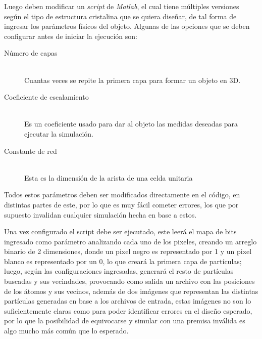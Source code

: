 Luego deben modificar un \emph{script} de \emph{Matlab}, el cual tiene múltiples versiones según el tipo de estructura cristalina que se quiera diseñar, de tal forma de ingresar los parámetros físicos del objeto. Algunas de las opciones que se deben configurar antes de iniciar la ejecución son:

\begin{description}
	\item [Número de capas] \hfill \\
		Cuantas veces se repite la primera capa para formar un objeto en 3D.
	\item [Coeficiente de escalamiento] \hfill \\
		Es un coeficiente usado para dar al objeto las medidas deseadas para ejecutar la simulación.
	\item [Constante de red] \hfill \\
		Esta es la dimensión de la arista de una celda unitaria
\end{description}

Todos estos parámetros deben ser modificados directamente en el código, en distintas partes de este, por lo que es muy fácil cometer errores, los que por supuesto invalidan cualquier simulación hecha en base a estos.

Una vez configurado el script debe ser ejecutado, este leerá el mapa de bits ingresado como parámetro analizando cada uno de los pixeles, creando un arreglo binario de 2 dimensiones, donde un pixel negro es representado por 1 y un pixel blanco es representado por un 0, lo que creará la primera capa de partículas; luego, según las configuraciones ingresadas, generará el resto de partículas buscadas y sus vecindades, provocando como salida un archivo con las posiciones de los átomos y sus vecinos, además de dos imágenes que representan las distintas partículas generadas en base a los archivos de entrada, estas imágenes no son lo suficientemente claras como para poder identificar errores en el diseño esperado, por lo que la posibilidad de equivocarse y simular con una premisa inválida es algo mucho más común que lo esperado.


